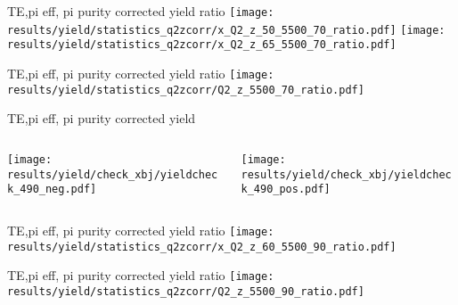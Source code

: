 \begin{frame}{TE,pi eff, pi purity corrected yield ratio}
\texttt{[image: results/yield/statistics\_q2zcorr/x\_Q2\_z\_50\_5500\_70\_ratio.pdf]}
\texttt{[image: results/yield/statistics\_q2zcorr/x\_Q2\_z\_65\_5500\_70\_ratio.pdf]}
\end{frame}
\begin{frame}{TE,pi eff, pi purity corrected yield ratio}
\texttt{[image: results/yield/statistics\_q2zcorr/Q2\_z\_5500\_70\_ratio.pdf]}
\end{frame}
\begin{frame}{TE,pi eff, pi purity corrected yield}
\begin{columns}
\begin{column}[T]{0.5\textwidth}
\texttt{[image: results/yield/check\_xbj/yieldcheck\_490\_neg.pdf]}
\end{column}
\begin{column}[T]{0.5\textwidth}
\texttt{[image: results/yield/check\_xbj/yieldcheck\_490\_pos.pdf]}
\end{column}
\end{columns}
\end{frame}
\begin{frame}{TE,pi eff, pi purity corrected yield ratio}
\texttt{[image: results/yield/statistics\_q2zcorr/x\_Q2\_z\_60\_5500\_90\_ratio.pdf]}
\end{frame}
\begin{frame}{TE,pi eff, pi purity corrected yield ratio}
\texttt{[image: results/yield/statistics\_q2zcorr/Q2\_z\_5500\_90\_ratio.pdf]}
\end{frame}

